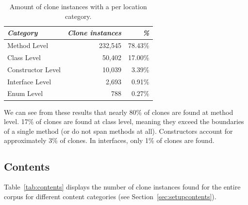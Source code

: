 \documentclass[runningheads]{llncs}
\begin{document}
\begin{table}[H]
\centering
\caption{Amount of clone instances with a per location category.}
\begin{tabular}{@{}lrr@{}}
\toprule
\textit{\textbf{Category}} & \textit{\textbf{Clone instances}} & \textit{\textbf{\%}} \\ \midrule
Method Level & 232,545 & 78.43\% \\
Class Level & 50,402 & 17.00\% \\
Constructor Level & 10,039 & 3.39\% \\
Interface Level & 2,693 & 0.91\% \\
Enum Level & 788 & 0.27\% \\
\end{tabular}
\label{tab:location}
\end{table}

We can see from these results that nearly 80\% of clones are found at method level. 17\% of clones are found at class level, meaning they exceed the boundaries of a single method (or do not span methods at all). Constructors account for approximately 3\% of clones. In interfaces, only 1\% of clones are found.

\subsection{Contents}
Table~\ref{tab:contents} displays the number of clone instances found for the entire corpus for different content categories (see Section~\ref{sec:setupcontents}).
\end{document}
